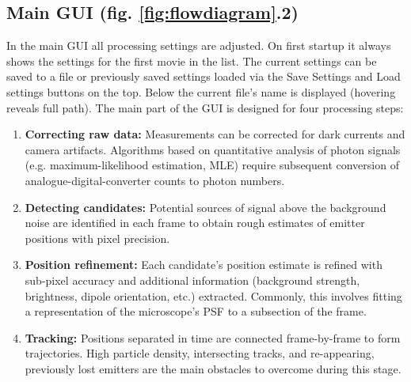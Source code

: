 \documentclass[11pt,onside]{report}
\numberwithin{equation}{chapter}
\begin{document}
\subsection*{Main GUI (fig. \ref{fig:flowdiagram}.2)}
In the main GUI all processing settings are adjusted. On first startup it always shows the settings for the first movie in the list. The current settings can be saved to a file or previously saved settings loaded via the \textsf{Save Settings} and \textsf{Load settings} buttons on the top. Below the current file's name is displayed (hovering reveals full path). The main part of the GUI is designed for four processing steps:
\begin{enumerate}
 \item \textbf{Correcting raw data:} Measurements can be corrected for dark currents and camera artifacts. Algorithms based on quantitative analysis of photon signals (e.g. maximum-likelihood estimation, MLE) require subsequent conversion of analogue-digital-converter counts to photon numbers.
 \item \textbf{Detecting candidates:} Potential sources of signal above the background noise are identified in each frame to obtain rough estimates of emitter positions with pixel precision. %
  \item \textbf{Position refinement:} Each candidate's position estimate is refined with sub-pixel accuracy and additional information (background strength, brightness, dipole orientation, etc.) extracted. Commonly, this involves fitting a representation of the microscope's PSF to a subsection of the frame.
    \item \textbf{Tracking:} Positions separated in time are connected frame-by-frame to form trajectories. High particle density, intersecting tracks, and re-appearing, previously lost emitters are the main obstacles to overcome during this stage.
\end{enumerate}
\end{document}
